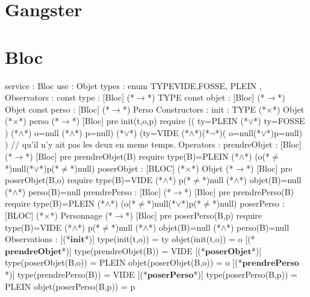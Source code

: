 \documentclass[a4paper, 11pt]{report}
\newcommand{\specB}[1]{\textbf{#1}}
\begin{document}
\section{Gangster}
\begin{Spe}
  
  
\end{Spe}

\section{Bloc}
\begin{Spe}
service : Bloc
use : Objet
types : enum TYPE{VIDE,FOSSE, PLEIN },
Observators :
      const type : [Bloc] (*$\rightarrow$*) TYPE
      const objet : [Bloc] (*$\rightarrow$*) Objet
      const perso : [Bloc] (*$\rightarrow$*) Perso
Constructors :
      init : TYPE (*$\times$*) Objet (*$\times$*) perso (*$\rightarrow$*) [Bloc]
            pre init(t,o,p) require 
            (( ty=PLEIN (*$\lor$*) ty=FOSSE ) (*$\land$*) o=null (*$\land$*) p=null) 
            (*$\lor$*) (ty=VIDE (*$\land$*)(*$\lnot$*)( o=null(*$\lor$*)p=null) ) // qu'il n'y ait pas les deux en meme temps.
Operators :
      prendreObjet : [Bloc] (*$\rightarrow$*) [Bloc]
            pre prendreObjet(B) require type(B)=PLEIN (*$\land$*) (o(*$\ne$*)null(*$\lor$*)p(*$\ne$*)null)
      poserObjet : [BLOC] (*$\times$*) Objet (*$\rightarrow$*) [Bloc]
            pre poserObjet(B,o) require type(B)=VIDE (*$\land$*) p(*$\ne$*)null (*$\land$*) 
            objet(B)=null (*$\land$*) perso(B)=null 
      prendrePerso : [Bloc] (*$\rightarrow$*) [Bloc]
            pre prendrePerso(B) require type(B)=PLEIN (*$\land$*) (o(*$\ne$*)null(*$\lor$*)p(*$\ne$*)null)
      poserPerso : [BLOC] (*$\times$*) Personnage (*$\rightarrow$*) [Bloc]
            pre poserPerso(B,p) require type(B)=VIDE (*$\land$*) p(*$\ne$*)null 
            (*$\land$*) objet(B)=null (*$\land$*) perso(B)=null 
Observations :
      [(*$\specB{init}$*)]
            type(init(t,o)) = ty
            objet(init(t,o)) = o
      [(*$\specB{prendreObjet}$*)]
            type(prendreObjet(B)) = VIDE
      [(*$\specB{poserObjet}$*)] 
            type(poserObjet(B,o)) = PLEIN
            objet(poserObjet(B,o)) = o 
      [(*$\specB{prendrePerso}$*)]
            type(prendrePerso(B)) = VIDE
      [(*$\specB{poserPerso}$*)] 
            type(poserPerso(B,p)) = PLEIN
            objet(poserPerso(B,p)) = p
\end{Spe}
 
\end{document}
